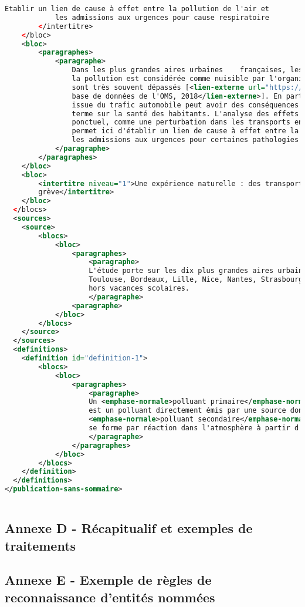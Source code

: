 \begin{lstlisting}[language=XML, basicstyle=\small]
            Établir un lien de cause à effet entre la pollution de l'air et 
            les admissions aux urgences pour cause respiratoire
        </intertitre> 
    </bloc>
    <bloc>
        <paragraphes>
            <paragraphe> 
                Dans les plus grandes aires urbaines    françaises, les seuils d'exposition au-delà desquels 
                la pollution est considérée comme nuisible par l'organisation mondiale de la santé (OMS) 
                sont très souvent dépassés [<lien-externe url="https://www.who.int/airpollution/data/cities/en/">
                base de données de l'OMS, 2018</lien-externe>]. En particulier, la pollution de l'air 
                issue du trafic automobile peut avoir des conséquences néfastes à très court 
                terme sur la santé des habitants. L'analyse des effets directs et indirects d'un événement 
                ponctuel, comme une perturbation dans les transports en commun un jour de grève, 
                permet ici d'établir un lien de cause à effet entre la pollution issue du trafic automobile et
                les admissions aux urgences pour certaines pathologies respiratoires. 
            </paragraphe>
        </paragraphes>
    </bloc>
    <bloc>
        <intertitre niveau="1">Une expérience naturelle : des transports en commun perturbés un jour de
        grève</intertitre> 
    </bloc>
  </blocs>
  <sources>
    <source>
        <blocs>
            <bloc>
                <paragraphes>
                    <paragraphe>
                    L'étude porte sur les dix plus grandes aires urbaines françaises (Paris, Lyon, Marseille,
                    Toulouse, Bordeaux, Lille, Nice, Nantes, Strasbourg, Rennes) sur la période 2010-2015, 
                    hors vacances scolaires.
                    </paragraphe> 
                <paragraphe>
            </bloc>
        </blocs>
    </source>
  </sources>
  <definitions>
    <definition id="definition-1">
        <blocs>
            <bloc>
                <paragraphes>
                    <paragraphe>
                    Un <emphase-normale>polluant primaire</emphase-normale> 
                    est un polluant directement émis par une source donnée, tandis qu'un 
                    <emphase-normale>polluant secondaire</emphase-normale> 
                    se forme par réaction dans l'atmosphère à partir d'autres polluants (l'ozone par exemple). 
                    </paragraphe>
                </paragraphes>
            </bloc>
        </blocs>
    </definition>
  </definitions>
</publication-sans-sommaire>
 
\end{lstlisting}
\label{publication-xml}
\newpage

\subsection*{Annexe D - Récapitualif et exemples de traitements}
\label{nlp-exemple}
\newpage

\subsection*{Annexe E - Exemple de règles de reconnaissance d'entités nommées}
\label{rule-exemple}
